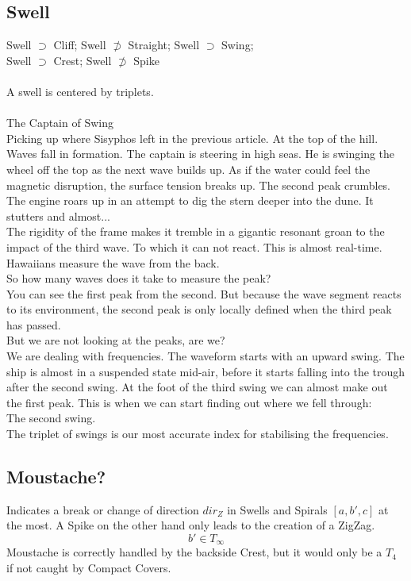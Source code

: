\documentclass{report}
\begin{document}
\subsection{Swell}
Swell $\supset$ Cliff; Swell $\not\supset$ Straight; Swell $\supset$ Swing;\\ Swell $\supset$ Crest; Swell $\not\supset$ Spike\\\\
A swell is centered by triplets.\\\\
The Captain of Swing\\
Picking up where Sisyphos left in the previous article. At the top of the hill. Waves fall in formation. The captain is steering in high seas. He is swinging the wheel off the top as the next wave builds up. As if the water could feel the magnetic disruption, the surface tension breaks up. The second peak crumbles. The engine roars up in an attempt to dig the stern deeper into the dune. It stutters and almost...\\
The rigidity of the frame makes it tremble in a gigantic resonant groan to the impact of the third wave. To which it can not react. This is almost real-time. Hawaiians measure the wave from the back.\\
So how many waves does it take to measure the peak?\\
You can see the first peak from the second. But because the wave segment reacts to its environment, the second peak is only locally defined when the third peak has passed.\\
But we are not looking at the peaks, are we?\\
We are dealing with frequencies. The waveform starts with an upward swing. The ship is almost in a suspended state mid-air, before it starts falling into the trough after the second swing. At the foot of the third swing we can almost make out the first peak. This is when we can start finding out where we fell through:\\
The second swing.\\
The triplet of swings is our most accurate index for stabilising the frequencies.

\subsection{Moustache?}
Indicates a break or change of direction $dir_{Z}$ in Swells and Spirals $[a,b',c]$ at the most. A Spike on the other hand only leads to the creation of a ZigZag.
\begin{equation}
b' \in T_{\infty}
\end{equation}
Moustache is correctly handled by the backside Crest, but it would only be a $T_{4}$ if not caught by Compact Covers.
\end{document}
